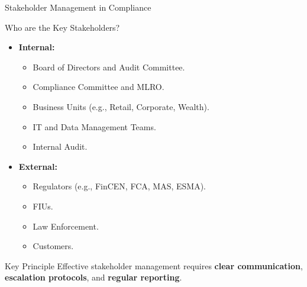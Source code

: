 \documentclass{beamer}
\begin{document}
	\begin{frame}{Stakeholder Management in Compliance}
		\begin{block}{Who are the Key Stakeholders?}
			\begin{itemize}
				\item \textbf{Internal:}
				\begin{itemize}
					\item Board of Directors and Audit Committee.
					\item Compliance Committee and MLRO.
					\item Business Units (e.g., Retail, Corporate, Wealth).
					\item IT and Data Management Teams.
					\item Internal Audit.
				\end{itemize}
				\item \textbf{External:}
				\begin{itemize}
					\item Regulators (e.g., FinCEN, FCA, MAS, ESMA).
					\item FIUs.
					\item Law Enforcement.
					\item Customers.
				\end{itemize}
			\end{itemize}
		\end{block}
		\begin{alertblock}{Key Principle}
			Effective stakeholder management requires \textbf{clear communication}, \textbf{escalation protocols}, and \textbf{regular reporting}.
		\end{alertblock}
	\end{frame}
	
\end{document}
